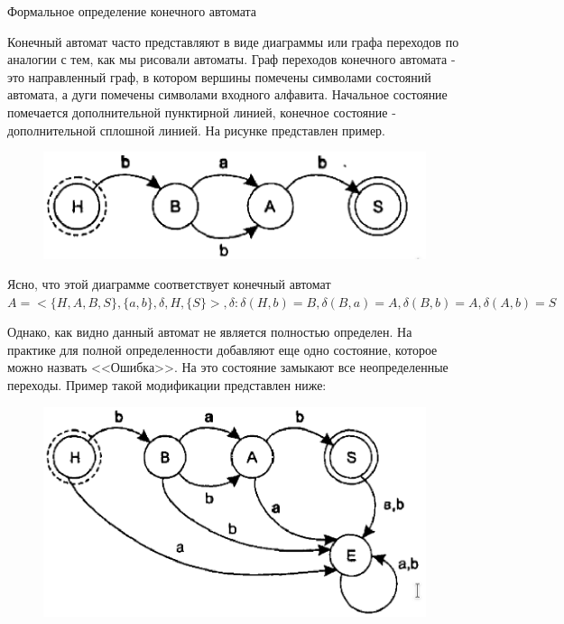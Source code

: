 \documentclass[12pt, pdf, hyperref={unicode},handout]{beamer}
\begin{document}
\begin{frame}{Формальное определение конечного автомата}
  \begin{block}

    \small{
      Конечный автомат часто представляют в виде диаграммы или графа переходов по аналогии с тем, как мы рисовали автоматы. Граф переходов конечного автомата - это направленный граф, в котором вершины помечены символами состояний автомата, а дуги помечены символами входного алфавита. Начальное состояние помечается дополнительной пунктирной линией, конечное состояние - дополнительной сплошной линией. На рисунке представлен пример.
       \begin{figure}[htb] 
    \centering
    \includegraphics [scale=0.7]{ris3.eps}
  \end{figure}

  Ясно, что этой диаграмме соответствует конечный автомат $A=<\{H, A, B, S\}, \{a,b\}, \delta, H, \{S\}>, \delta: \delta(H,b)=B, \delta(B,a)=A, \delta(B,b)=A, \delta(A,b)=S$

  Однако, как видно данный автомат не является полностью определен. На практике для полной определенности добавляют еще одно состояние, которое можно назвать <<Ошибка>>. На это состояние замыкают все неопределенные переходы. Пример такой модификации представлен ниже:
       \begin{figure}[htb] 
    \centering
    \includegraphics [scale=0.5]{ris4.eps}
  \end{figure}
}

  \end{block}
  
\end{frame}
\end{document}
